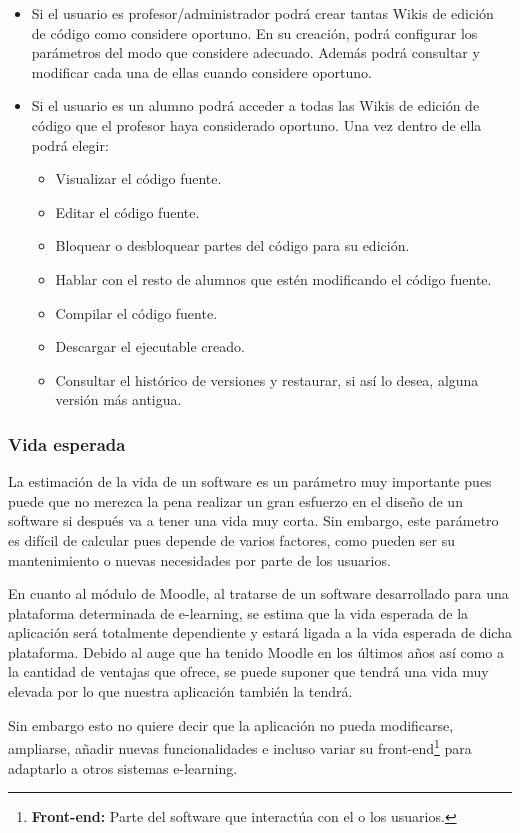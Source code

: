 \begin{itemize}
	\item Si el usuario es profesor/administrador podrá crear tantas Wikis de edición de código como considere oportuno. En su creación, podrá configurar los parámetros del modo que considere adecuado. Además podrá consultar y modificar cada una de ellas cuando considere oportuno.
	\item Si el usuario es un alumno podrá acceder a todas las Wikis de edición de código que el profesor haya considerado oportuno. Una vez dentro de ella podrá elegir:
	\begin{itemize}
		\item Visualizar el código fuente.
		\item Editar el código fuente.
		\item Bloquear o desbloquear partes del código para su edición.
		\item Hablar con el resto de alumnos que estén modificando el código fuente.
		\item Compilar el código fuente.
		\item Descargar el ejecutable creado.
		\item Consultar el histórico de versiones y restaurar, si así lo desea, alguna versión más antigua.
	\end{itemize}
\end{itemize}

\subsubsection{Vida esperada}

La estimación de la vida de un software es un parámetro muy importante pues puede que no merezca la pena realizar un gran esfuerzo en el diseño de un software si después va a tener una vida muy corta. Sin embargo, este parámetro es difícil de calcular pues depende de varios factores, como pueden ser su mantenimiento o nuevas necesidades por parte de los usuarios.

En cuanto al módulo de Moodle, al tratarse de un software desarrollado para una plataforma determinada de e-learning, se estima que la vida esperada de la aplicación será totalmente dependiente y estará ligada a la vida esperada de dicha plataforma. Debido al auge que ha tenido Moodle en los últimos años así como a la cantidad de ventajas que ofrece, se puede suponer que tendrá una vida muy elevada por lo que nuestra aplicación también la tendrá.

Sin embargo esto no quiere decir que la aplicación no pueda modificarse, ampliarse, añadir nuevas funcionalidades e incluso variar su front-end\footnote{\textbf{Front-end:} Parte del software que interactúa con el o los usuarios.} para adaptarlo a otros sistemas e-learning. 

